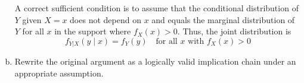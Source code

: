 \documentclass[letterpaper,12pt]{article}
\begin{document}
\begin{enumerate}[(a)]
\begin{list}{}{}
        A correct sufficient condition is to assume that the conditional distribution of $Y$ given $X = x$ does not depend on $x$ and equals the marginal distribution of $Y$ for all $x$ in the support where $f_X(x) > 0$. Thus, the joint distribution is
        \[
        f_{Y|X}(y \mid x) = f_Y(y) \quad \text{for all } x \text{ with } f_X(x) > 0 \text{}
        \]
    \end{list}
    \item Rewrite the original argument as a logically valid implication chain under an appropriate assumption.
    \vspace{0.5em}
\end{enumerate}
\end{document}
